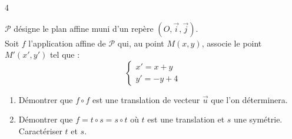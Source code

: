 \documentclass{axiobac}
\begin{document}
\begin{exercice}{4}
\horsprogramme

$\mathcal{P}$ désigne le plan affine muni d'un repère $(O, \vec{i}, \vec{j})$. \\
Soit $f$ l'application affine de $\mathcal{P}$ qui, au point $M(x, y)$, associe le point $M'(x', y')$ tel que :
\[
\begin{cases}
    x' = x + y \\
    y' = -y + 4
\end{cases}
\]

\begin{enumerate}
    \item Démontrer que $f \circ f$ est une translation de vecteur $\vec{u}$ que l'on déterminera.
    \item Démontrer que $f = t \circ s = s \circ t$ où $t$ est une translation et $s$ une symétrie. Caractériser $t$ et $s$.
\end{enumerate}

\end{exercice}
\end{document}
